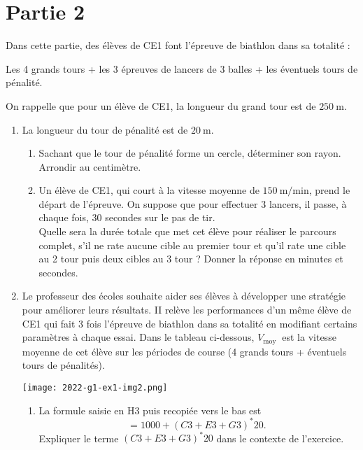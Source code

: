 \section*{Partie 2}

Dans cette partie, des élèves de CE1 font l'épreuve de biathlon dans sa totalité :

Les 4 grands tours + les 3 épreuves de lancers de 3 balles + les éventuels tours de pénalité.

\medskip
On rappelle que pour un élève de CE1, la longueur du grand tour est de $250 \mathrm{~m}$.

\medskip
\begin{enumerate}
  \item La longueur du tour de pénalité est de $20 \mathrm{~m}$.
  
  \begin{enumerate}
  	\item Sachant que le tour de pénalité forme un cercle, déterminer son rayon. Arrondir au centimètre.
  	\item Un élève de CE1, qui court à la vitesse moyenne de $150 \mathrm{~m} / \mathrm{min}$, prend le départ de l'épreuve. On suppose que pour effectuer 3 lancers, il passe, à chaque fois, 30 secondes sur le pas de tir.\\
Quelle sera la durée totale que met cet élève pour réaliser le parcours complet, s'il ne rate aucune cible au premier tour et qu'il rate une cible au 2 tour puis deux cibles au 3 tour ? Donner la réponse en minutes et secondes.

	\end{enumerate}

  \item Le professeur des écoles souhaite aider ses élèves à développer une stratégie pour améliorer leurs résultats. II relève les performances d'un même élève de CE1 qui fait 3 fois l'épreuve de biathlon dans sa totalité en modifiant certains paramètres à chaque essai. Dans le tableau ci-dessous, $V_{\text {moy }}$ est la vitesse moyenne de cet élève sur les périodes de course (4 grands tours + éventuels tours de pénalités).


\begin{center}
  \texttt{[image: 2022-g1-ex1-img2.png]}	
\end{center}

	\begin{enumerate}
		\item La formule saisie en H3 puis recopiée vers le bas est
$$
=1000+(C 3+E 3+G 3)^{*} 20 \text {. }
$$
Expliquer le terme $(C 3+E 3+G 3)^{*} 20$ dans le contexte de l'exercice.


\end{enumerate}
\end{enumerate}
